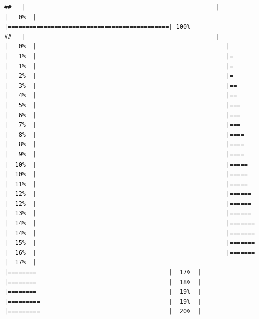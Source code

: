 \documentclass[
  krantz2]{krantz}
\begin{document}
\begin{verbatim}
##   |                                                     |                                             |   0%  |                                                     |=============================================| 100%
##   |                                                     |                                             |   0%  |                                                     |                                             |   1%  |                                                     |=                                            |   1%  |                                                     |=                                            |   2%  |                                                     |=                                            |   3%  |                                                     |==                                           |   4%  |                                                     |==                                           |   5%  |                                                     |===                                          |   6%  |                                                     |===                                          |   7%  |                                                     |===                                          |   8%  |                                                     |====                                         |   8%  |                                                     |====                                         |   9%  |                                                     |====                                         |  10%  |                                                     |=====                                        |  10%  |                                                     |=====                                        |  11%  |                                                     |=====                                        |  12%  |                                                     |======                                       |  12%  |                                                     |======                                       |  13%  |                                                     |======                                       |  14%  |                                                     |=======                                      |  14%  |                                                     |=======                                      |  15%  |                                                     |=======                                      |  16%  |                                                     |=======                                      |  17%  |                                                     |========                                     |  17%  |                                                     |========                                     |  18%  |                                                     |========                                     |  19%  |                                                     |=========                                    |  19%  |                                                     |=========                                    |  20%  |     
\end{verbatim}
\end{document}
